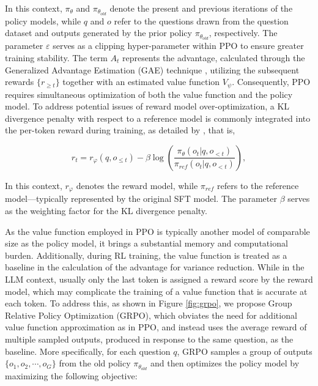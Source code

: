 \begin{itemize}[topsep=0pt]
\begin{itemize}[topsep=0pt]
In this context, $\pi_{\theta}$ and $\pi_{\theta_{old}}$ denote the present and previous iterations of the policy models, while $q$ and $o$ refer to the questions drawn from the question dataset and outputs generated by the prior policy $\pi_{\theta_{old}}$, respectively. The parameter $\varepsilon$ serves as a clipping hyper-parameter within PPO to ensure greater training stability. The term $A_t$ represents the advantage, calculated through the Generalized Advantage Estimation (GAE) technique \citep{gae}, utilizing the subsequent rewards $\{r_{\ge t}\}$ together with an estimated value function $V_{\psi}$. Consequently, PPO requires simultaneous optimization of both the value function and the policy model. To address potential issues of reward model over-optimization, a KL divergence penalty with respect to a reference model is commonly integrated into the per-token reward during training, as detailed by \citet{ouyang2022training}, that is,

\begin{equation}
    r_{t} = r_\varphi(q, o_{\le t}) - \beta \log\left(\frac{\pi_{\theta}(o_{t}|q, o_{<t})}{\pi_{ref}(o_{t}|q, o_{<t})}\right),
\label{eq:PPO-reward}
\end{equation}

In this context, $r_\varphi$ denotes the reward model, while $\pi_{ref}$ refers to the reference model—typically represented by the original SFT model. The parameter $\beta$ serves as the weighting factor for the KL divergence penalty.

As the value function employed in PPO is typically another model of comparable size as the policy model, it brings a substantial memory and computational burden. Additionally, during RL training, the value function is treated as a baseline in the calculation of the advantage for variance reduction. While in the LLM context, usually only the last token is assigned a reward score by the reward model, which may complicate the training of a value function that is accurate at each token. To address this, as shown in Figure \ref{fig:grpo}, we propose Group Relative Policy Optimization (GRPO), which obviates the need for additional value function approximation as in PPO, and instead uses the average reward of multiple sampled outputs, produced in response to the same question, as the baseline. More specifically, for each question $q$, GRPO samples a group of outputs $\{o_1, o_2, \cdots, o_G\}$  from the old policy  $\pi_{\theta_{old}}$  and then optimizes the policy model by maximizing the following objective:


\end{itemize}
\end{itemize}
